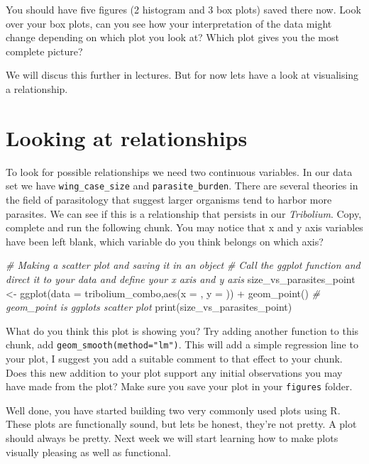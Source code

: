 \documentclass[
]{book}
\newenvironment{Shaded}{\begin{snugshade}}{\end{snugshade}}
\newcommand{\AttributeTok}[1]{\textcolor[rgb]{0.77,0.63,0.00}{#1}}
\newcommand{\CommentTok}[1]{\textcolor[rgb]{0.56,0.35,0.01}{\textit{#1}}}
\newcommand{\FunctionTok}[1]{\textcolor[rgb]{0.00,0.00,0.00}{#1}}
\newcommand{\NormalTok}[1]{#1}
\newcommand{\OtherTok}[1]{\textcolor[rgb]{0.56,0.35,0.01}{#1}}
\newcommand{\SpecialCharTok}[1]{\textcolor[rgb]{0.00,0.00,0.00}{#1}}
\begin{document}
You should have five figures (2 histogram and 3 box plots) saved there now. Look over your box plots, can you see how your interpretation of the data might change depending on which plot you look at? Which plot gives you the most complete picture?

We will discus this further in lectures. But for now lets have a look at visualising a relationship.

\hypertarget{scatter}{%
\section{Looking at relationships}\label{scatter}}

To look for possible relationships we need two continuous variables. In our data set we have \texttt{wing\_case\_size} and \texttt{parasite\_burden}. There are several theories in the field of parasitology that suggest larger organisms tend to harbor more parasites. We can see if this is a relationship that persists in our \emph{Tribolium}. Copy, complete and run the following chunk. You may notice that x and y axis variables have been left blank, which variable do you think belongs on which axis?

\begin{Shaded}
\begin{Highlighting}[]
\CommentTok{\# Making a scatter plot and saving it in an object}
\CommentTok{\# Call the ggplot function and direct it to your data and define your x axis and y axis}
\NormalTok{size\_vs\_parasites\_point }\OtherTok{\textless{}{-}} \FunctionTok{ggplot}\NormalTok{(}\AttributeTok{data =}\NormalTok{ tribolium\_combo,}\FunctionTok{aes}\NormalTok{(}\AttributeTok{x =}\NormalTok{ , }\AttributeTok{y =}\NormalTok{ )) }\SpecialCharTok{+} 
  \FunctionTok{geom\_point}\NormalTok{() }\CommentTok{\# geom\_point is ggplots scatter plot}
\FunctionTok{print}\NormalTok{(size\_vs\_parasites\_point)}
\end{Highlighting}
\end{Shaded}

What do you think this plot is showing you? Try adding another function to this chunk, add \texttt{geom\_smooth(method="lm")}. This will add a simple regression line to your plot, I suggest you add a suitable comment to that effect to your chunk. Does this new addition to your plot support any initial observations you may have made from the plot? Make sure you save your plot in your \texttt{figures} folder.

Well done, you have started building two very commonly used plots using R. These plots are functionally sound, but lets be honest, they're not pretty. A plot should always be pretty. Next week we will start learning how to make plots visually pleasing as well as functional.
\end{document}
